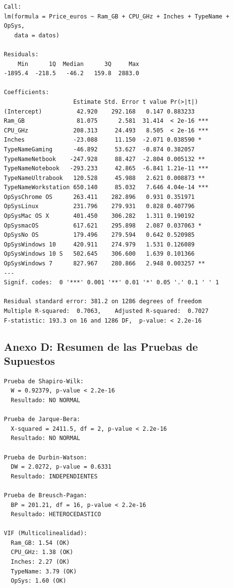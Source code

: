 \documentclass[12pt,a4paper]{article}
\begin{document}
\begin{verbatim}
Call:
lm(formula = Price_euros ~ Ram_GB + CPU_GHz + Inches + TypeName + OpSys, 
   data = datos)

Residuals:
    Min      1Q  Median      3Q     Max 
-1895.4  -218.5   -46.2   159.8  2883.0 

Coefficients:
                    Estimate Std. Error t value Pr(>|t|)    
(Intercept)          42.920    292.168   0.147 0.883233    
Ram_GB               81.075      2.581  31.414  < 2e-16 ***
CPU_GHz             208.313     24.493   8.505  < 2e-16 ***
Inches              -23.088     11.150  -2.071 0.038590 *  
TypeNameGaming      -46.892     53.627  -0.874 0.382057    
TypeNameNetbook    -247.928     88.427  -2.804 0.005132 ** 
TypeNameNotebook   -293.233     42.865  -6.841 1.21e-11 ***
TypeNameUltrabook   120.528     45.988   2.621 0.008873 ** 
TypeNameWorkstation 650.140     85.032   7.646 4.04e-14 ***
OpSysChrome OS      263.411    282.896   0.931 0.351971    
OpSysLinux          231.796    279.931   0.828 0.407796    
OpSysMac OS X       401.450    306.282   1.311 0.190192    
OpSysmacOS          617.621    295.898   2.087 0.037063 *  
OpSysNo OS          179.496    279.594   0.642 0.520985    
OpSysWindows 10     420.911    274.979   1.531 0.126089    
OpSysWindows 10 S   502.645    306.600   1.639 0.101366    
OpSysWindows 7      827.967    280.866   2.948 0.003257 ** 
---
Signif. codes:  0 '***' 0.001 '**' 0.01 '*' 0.05 '.' 0.1 ' ' 1

Residual standard error: 381.2 on 1286 degrees of freedom
Multiple R-squared:  0.7063,    Adjusted R-squared:  0.7027 
F-statistic: 193.3 on 16 and 1286 DF,  p-value: < 2.2e-16
\end{verbatim}

\subsection{Anexo D: Resumen de las Pruebas de Supuestos}

\begin{verbatim}
Prueba de Shapiro-Wilk:
  W = 0.92379, p-value < 2.2e-16
  Resultado: NO NORMAL

Prueba de Jarque-Bera:
  X-squared = 2411.5, df = 2, p-value < 2.2e-16
  Resultado: NO NORMAL

Prueba de Durbin-Watson:
  DW = 2.0272, p-value = 0.6331
  Resultado: INDEPENDIENTES

Prueba de Breusch-Pagan:
  BP = 201.21, df = 16, p-value < 2.2e-16
  Resultado: HETEROCEDASTICO

VIF (Multicolinealidad):
  Ram_GB: 1.54 (OK)
  CPU_GHz: 1.38 (OK)
  Inches: 2.27 (OK)
  TypeName: 3.79 (OK)
  OpSys: 1.60 (OK)
\end{verbatim}

\end{document}
